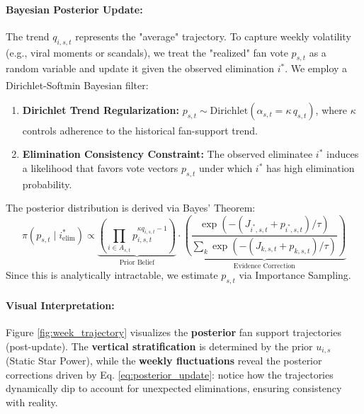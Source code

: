 \documentclass[12pt]{article}
\begin{document}
\paragraph{Bayesian Posterior Update:}

The trend $q_{i,s,t}$ represents the "average" trajectory. To capture weekly volatility (e.g., viral moments or scandals), we treat the "realized" fan vote $p_{s,t}$ as a random variable and update it given the observed elimination $i^*$.
We employ a Dirichlet-Softmin Bayesian filter\textsuperscript{\cite{gelman2013}}:
\begin{enumerate}
	\item \textbf{Dirichlet Trend Regularization:}
	$p_{s,t} \sim \mathrm{Dirichlet}(\alpha_{s,t}=\kappa\,q_{s,t})$, where $\kappa$ controls adherence to the historical fan-support trend.\textsuperscript{\cite{bishop2006}}
	\item \textbf{Elimination Consistency Constraint:}
	The observed eliminatee $i^*$ induces a likelihood that favors vote vectors $p_{s,t}$ under which $i^*$ has high elimination probability.
\end{enumerate}

The posterior distribution is derived via Bayes' Theorem:
\begin{equation} \label{eq:posterior_update}
	\pi(p_{s,t} \mid i^*_{\text{elim}}) \propto \underbrace{\left( \prod_{i \in A_{s,t}} p_{i,s,t}^{\kappa q_{i,s,t} - 1} \right)}_{\text{Prior Belief}} \cdot \underbrace{\left( \frac{\exp(-(J_{i^*,s,t} + p_{i^*,s,t})/\tau)}{\sum_{k} \exp(-(J_{k,s,t} + p_{k,s,t})/\tau)} \right)}_{\text{Evidence Correction}}
\end{equation}
Since this is analytically intractable, we estimate $p_{s,t}$ via Importance Sampling.


\paragraph{Visual Interpretation:}
Figure \ref{fig:week_trajectory} visualizes the \textbf{posterior} fan support trajectories (post-update). The \textbf{vertical stratification} is determined by the prior $u_{i,s}$ (Static Star Power), while the \textbf{weekly fluctuations} reveal the posterior corrections driven by Eq. \eqref{eq:posterior_update}: notice how the trajectories dynamically dip to account for unexpected eliminations, ensuring consistency with reality.
\end{document}
